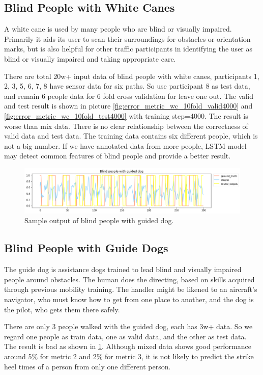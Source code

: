 \documentclass[11pt]{article}
\begin{document}
{\subsection{Blind People with White Canes}
A white cane is used by many people who are blind or visually impaired. Primarily it aids its user to scan their surroundings for obstacles or orientation marks, but is also helpful for other traffic participants in identifying the user as blind or visually impaired and taking appropriate care.

There are total 20w+ input data of blind people with white canes, participants 1, 2, 3, 5, 6, 7, 8 have sensor data for six paths. So use participant 8 as test data, and remain 6 people data for 6 fold cross validation for leave one out. The valid and test result is shown in picture \ref{fig:error_metric_wc_10fold_valid4000} and \ref{fig:error_metric_wc_10fold_test4000} with training step=4000. The result is worse than mix data. There is no clear relationship between the correctness of valid data and test data. The training data contains six different people, which is not a big number. If we have annotated data from more people, LSTM model may detect common features of blind people and provide a better result.

\begin{figure}[ht]
\centering
\includegraphics[scale=0.5]{blind_gd}
\caption{Sample output of blind people with guided dog.}
\label{fig:blind_gd}
\end{figure}


\subsection{Blind People with Guide Dogs}

The guide dog is assistance dogs trained to lead blind and visually impaired people around obstacles. The human does the directing, based on skills acquired through previous mobility training. The handler might be likened to an aircraft's navigator, who must know how to get from one place to another, and the dog is the pilot, who gets them there safely.

There are only 3 people walked with the guided dog, each has 3w+ data. So we regard one people as train data, one as valid data, and the other as test data. The result is bad as shown in \ref{fig:blind_gd}. Although mixed data shows good performance around 5\% for metric 2 and 2\% for metric 3, it is not likely to predict the strike heel times of a person from only one different person.

}
\end{document}
